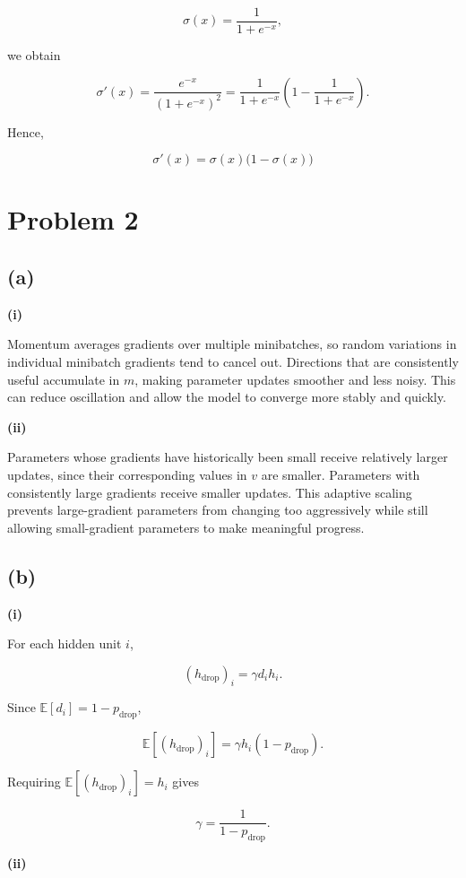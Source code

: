 \documentclass[a4paper,10pt]{article}
\begin{document}
\[
\sigma(x)=\frac{1}{1+e^{-x}},
\]

we obtain

\[
\sigma'(x) =\frac{e^{-x}}{(1+e^{-x})^2} =\frac{1}{1+e^{-x}}\left(1-\frac{1}{1+e^{-x}}\right).
\]

Hence,

\[
\sigma'(x)=\sigma(x)\bigl(1-\sigma(x)\bigr)
\]

\section{Problem 2}\label{problem-2}

\subsection{(a)}\label{a-1}

\textbf{(i)}

Momentum averages gradients over multiple minibatches, so random variations in individual minibatch gradients tend to cancel out. Directions that are consistently useful accumulate in \(m\), making parameter updates smoother and less noisy. This can reduce oscillation and allow the model to converge more stably and quickly.

\textbf{(ii)}

Parameters whose gradients have historically been small receive relatively larger updates, since their corresponding values in \(v\) are smaller. Parameters with consistently large gradients receive smaller updates. This adaptive scaling prevents large-gradient parameters from changing too aggressively while still allowing small-gradient parameters to make meaningful progress.

\subsection{(b)}\label{b-1}

\textbf{(i)}

For each hidden unit \(i\),

\[
(h_{\text{drop}})_i=\gamma d_i h_i.
\]

Since \(\mathbb{E}[d_i]=1-p_{\text{drop}}\),

\[
\mathbb{E}[(h_{\text{drop}})_i]=
\gamma h_i(1-p_{\text{drop}}).
\]

Requiring \(\mathbb{E}[(h_{\text{drop}})_i]=h_i\) gives

\[
\gamma=\frac{1}{1-p_{\text{drop}}}.
\]

\textbf{(ii)}
\end{document}
